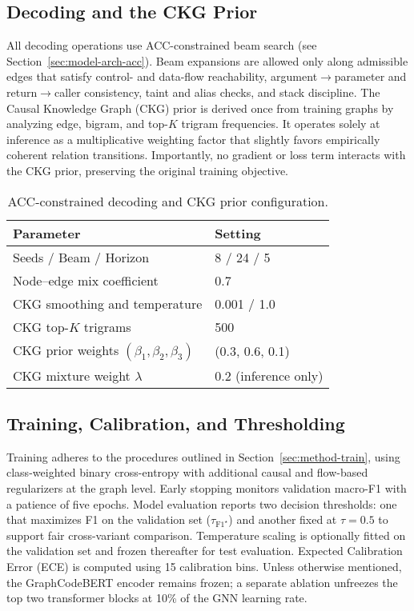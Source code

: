\documentclass{buthesis}
\begin{document}
\subsection{Decoding and the CKG Prior}
\label{subsec:results-decoding}

All decoding operations use ACC-constrained beam search (see Section~\ref{sec:model-arch-acc}). Beam expansions are allowed only along admissible edges that satisfy control- and data-flow reachability, argument$\rightarrow$parameter and return$\rightarrow$caller consistency, taint and alias checks, and stack discipline. The Causal Knowledge Graph (CKG) prior is derived once from training graphs by analyzing edge, bigram, and top-$K$ trigram frequencies. It operates solely at inference as a multiplicative weighting factor that slightly favors empirically coherent relation transitions. Importantly, no gradient or loss term interacts with the CKG prior, preserving the original training objective.

\begin{table}[H]
\centering
\small
\setlength{\tabcolsep}{6pt}
\renewcommand{\arraystretch}{1.12}
\caption{ACC-constrained decoding and CKG prior configuration.}
\label{tab:results-decoding}
\begin{tabular}{l l}
\toprule
\textbf{Parameter} & \textbf{Setting} \\
\midrule
Seeds / Beam / Horizon & 8 / 24 / 5 \\
Node–edge mix coefficient & 0.7 \\
CKG smoothing and temperature & 0.001 / 1.0 \\
CKG top-$K$ trigrams & 500 \\
CKG prior weights $(\beta_1, \beta_2, \beta_3)$ & (0.3, 0.6, 0.1) \\
CKG mixture weight $\lambda$ & 0.2 (inference only) \\
\bottomrule
\end{tabular}
\end{table}

\subsection{Training, Calibration, and Thresholding}
\label{subsec:results-calibration}

Training adheres to the procedures outlined in Section~\ref{sec:method-train}, using class-weighted binary cross-entropy with additional causal and flow-based regularizers at the graph level. Early stopping monitors validation macro-F1 with a patience of five epochs. Model evaluation reports two decision thresholds: one that maximizes F1 on the validation set ($\tau_{\text{F1}^\star}$) and another fixed at $\tau{=}0.5$ to support fair cross-variant comparison. Temperature scaling is optionally fitted on the validation set and frozen thereafter for test evaluation. Expected Calibration Error (ECE) is computed using 15 calibration bins. Unless otherwise mentioned, the GraphCodeBERT encoder remains frozen; a separate ablation unfreezes the top two transformer blocks at 10\% of the GNN learning rate.
\end{document}
